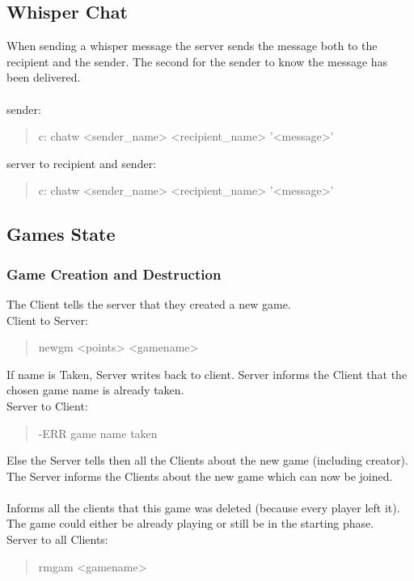 \documentclass[a4paper,11pt]{article}
\begin{document}
\subsection{Whisper Chat}
When sending a whisper message the server sends the message both to the recipient and the sender. The second for the sender to know the message has been delivered.\\\\

\noindent
sender:
\begin{quote}
  c: chatw <sender\_name> <recipient\_name> '<message>'\\
\end{quote}

\noindent
server to recipient and sender:
\begin{quote}
  c: chatw <sender\_name> <recipient\_name> '<message>'\\
\end{quote}
\clearpage
\subsection{Games State}

\subsubsection{Game Creation and Destruction}
The Client tells the server that they created a new game.\\
Client to Server:
\begin{quote}
  newgm <points> <gamename>
\end{quote}

\noindent
If name is Taken, Server writes back to client. Server informs the Client that the chosen game name is already taken.\\
Server to Client:
\begin{quote}
  -ERR game name taken
\end{quote}

\noindent
Else the Server tells then all the Clients about the new game (including creator). The Server informs the Clients about the new game which can now be joined.\\\\

Informs all the clients that this game was deleted (because every player left it).	The game could either be already playing or still be in the starting phase.\\
Server to all Clients:
\begin{quote}
  rmgam <gamename>
\end{quote}
\end{document}
